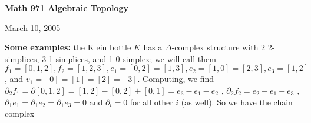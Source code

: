 \def\ccy{\Cyan}		  %
\def\cpb{\ProcessBlue}	  %
\def\csb{\SkyBlue}	  %
\def\ctu{\Turquoise}	  %
\def\ctb{\TealBlue}	  %
\def\caq{\Aquamarine}	  %
\def\cbg{\BlueGreen}	  %
\def\cem{\Emerald}	  %
\def\csg{\SeaGreen}	  %
\def\cgg{\Green}	  %
\def\cfg{\ForestGreen}	  %
\def\cpg{\PineGreen}	  %
\def\clg{\LimeGreen}	  %
\def\cyg{\YellowGreen}	  %
\def\cspg{\SpringGreen}	  %
\def\cog{\OliveGreen}	  %
\def\pars{\RawSienna}	  %
\def\cse{\Sepia}		  %
\def\cbr{\Brown}		  %
\def\cta{\Tan}		  %
\def\cgr{\Gray}		  %
\def\cbl{\Black}		  %
\def\cwh{\White}		  %


\loadmsbm



\def\ctln{\centerline}
\def\u{\underbar}
\def\ssk{\smallskip}
\def\msk{\medskip}
\def\bsk{\bigskip}
\def\hsk{\hskip.1in}
\def\hhsk{\hskip.2in}
\def\dsl{\displaystyle}
\def\hskp{\hskip1.5in}

\def\lra{$\Leftrightarrow$ }
\def\ra{\rightarrow}
\def\mpto{\logmapsto}
\def\pu{\pi_1}
\def\mpu{$\pi_1$}
\def\sig{\Sigma}
\def\msig{$\Sigma$}
\def\ep{\epsilon}
\def\sset{\subseteq}
\def\del{\partial}
\def\inv{^{-1}}
\def\wtl{\widetilde}
\def\lra{\Leftrightarrow}



\ctln{\bf Math 971 Algebraic Topology}

\ssk

\ctln{March 10, 2005}

\msk

{\bf Some examples:} the Klein bottle $K$ has a $\Delta$-complex structure with 2 2-simplices,
3 1-simplices, and 1 0-simplex; we will call them 
$f_1=[0,1,2],f_2=[1,2,3],
e_1=[0,2]=[1,3],e_2=[1,0]=[2,3],e_3=[1,2]$, 
and $v_1=[0]=[1]=[2]=[3]$.
Computing, we find 
$\del_2 f_1 = \del[0,1,2]=[1,2]-[0,2]+[0,1]=e_3-e_1-e_2$ , $\del_2 f_2 = e_2-e_1+e_3$ , 
$\del_1 e_1 = \del_1 e_2 = \del_1 e_3 = 0$ and $\del_i = 0$ for all other $i$
(as well). So we have the chain complex

